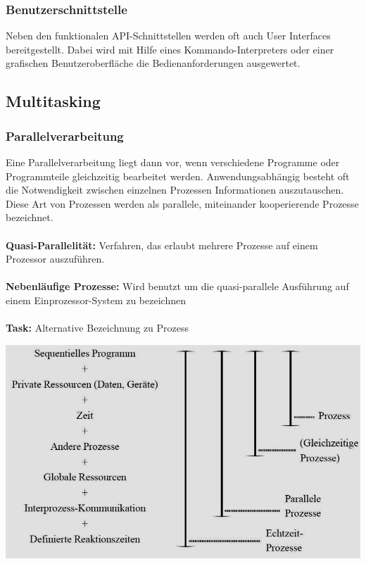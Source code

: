 \subsubsection{Benutzerschnittstelle}
Neben den funktionalen API-Schnittstellen werden oft auch User Interfaces bereitgestellt. Dabei wird mit Hilfe eines Kommando-Interpreters oder einer grafischen Benutzeroberfläche die Bedienanforderungen ausgewertet.


\subsection{Multitasking}

\subsubsection{Parallelverarbeitung}
\begin{minipage}{0.5\textwidth}
    Eine Parallelverarbeitung liegt dann vor, wenn verschiedene Programme oder Programmteile gleichzeitig bearbeitet werden. Anwendungsabhängig besteht oft die Notwendigkeit zwischen einzelnen Prozessen Informationen auszutauschen. Diese Art von Prozessen werden als parallele, miteinander kooperierende Prozesse bezeichnet. \\ \\
    \textbf{Quasi-Parallelität:} Verfahren, das erlaubt mehrere Prozesse auf einem Prozessor auszuführen.\\ \\
    \textbf{Nebenläufige Prozesse:} Wird benutzt um die quasi-parallele Ausführung auf einem Einprozessor-System zu bezeichnen\\ \\
    \textbf{Task:} Alternative Bezeichnung zu Prozess
\end{minipage}
\hfill
\begin{minipage}{0.45\textwidth}
    \includegraphics[width=1.0\textwidth]{images/Betriebssysteme/Parallelverarbeitung.png}
\end{minipage}
	
